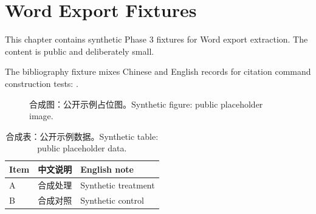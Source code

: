 \chapter{Word Export Fixtures}

This chapter contains synthetic Phase 3 fixtures for Word export extraction.
The content is public and deliberately small.

The bibliography fixture mixes Chinese and English records for citation command
construction tests: \cite{synthetic-zh-2026,synthetic-en-2026}.

\begin{figure}[htbp]
  \centering
  \fbox{\rule{0pt}{24mm}\rule{48mm}{0pt}}
  \caption{合成图：公开示例占位图。Synthetic figure: public placeholder image.}
  \label{fig:synthetic-bilingual}
\end{figure}

\begin{table}[htbp]
  \centering
  \caption{合成表：公开示例数据。Synthetic table: public placeholder data.}
  \label{tab:synthetic-bilingual}
  \begin{tabular}{lll}
    \hline
    Item & 中文说明 & English note \\
    \hline
    A & 合成处理 & Synthetic treatment \\
    B & 合成对照 & Synthetic control \\
    \hline
  \end{tabular}
\end{table}
